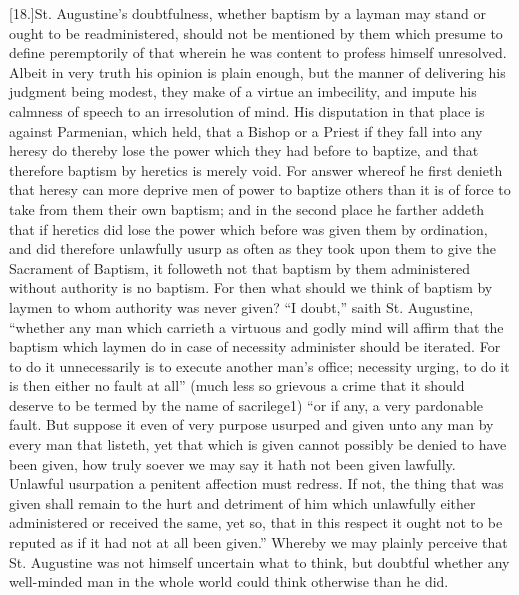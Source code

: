 [18.]St. Augustine’s doubtfulness, whether baptism by a layman may stand or ought to be readministered, should not be mentioned by them which presume to define peremptorily of that wherein he was content to profess himself unresolved. Albeit in very truth his opinion is plain enough, but the manner of delivering his judgment being modest, they make of a virtue an imbecility, and impute his calmness of speech to an irresolution of mind. His disputation in that place is against Parmenian, which held, that a Bishop or a Priest if they fall into any heresy do thereby lose the power which they had before to baptize, and that therefore baptism by heretics is merely void. For answer whereof he first denieth that heresy can more deprive men of power to baptize others than it is of force to take from them their own baptism; and in the second place he farther addeth that if heretics did lose the power which before was given them by ordination, and did therefore unlawfully usurp as often as they took upon them to give the Sacrament of Baptism, it followeth not that baptism by them administered without authority is no baptism. For then what should we think of baptism by laymen to whom authority was never given? “I doubt,” saith St. Augustine, “whether  any man which carrieth a virtuous and godly mind will affirm that the baptism which laymen do in case of necessity administer should be iterated.
 For to do it unnecessarily is to execute another man’s office; necessity urging, to do it is then either no fault at all” (much less so grievous a crime that it should deserve to be termed by the name of sacrilege1) “or if any, a very pardonable fault. But suppose it even of very purpose usurped and given unto any man by every man that listeth, yet that which is given cannot possibly be denied to have been given, how truly soever we may say it hath not been given lawfully. Unlawful usurpation a penitent affection must redress. If not, the thing that was given shall remain to the hurt and detriment of him which unlawfully either administered or received the same, yet so, that in this respect it ought not to be reputed as if it had not at all been given.” Whereby we may plainly perceive that St. Augustine was not himself uncertain what to think, but doubtful whether any well-minded man in the whole world could think otherwise than he did.

